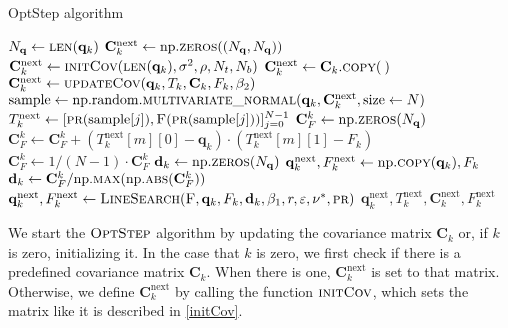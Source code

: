 \begin{algorithm}[H]%
\caption{\label{OptStep}OptStep algorithm}
\begin{algorithmic}[1]
\State $N_\mathbf{q}\gets\Call{len}{\mathbf{q}_k}$
\State $\mathbf{C}^\mathrm{next}_k \gets \mathrm{np.}\Call{zeros}{(N_\mathbf{q}, N_\mathbf{q})}$
\label{alg2differ1}
\State $\mathbf{C}^\mathrm{next}_k \gets \Call{initCov}{\protect\Call{len}{\mathbf{q}_k}, \sigma^2, \rho, N_t, N_b}$
\Else
\State $\mathbf{C}^\mathrm{next}_k \gets \mathbf{C}_k.\Call{copy}{\:}$
\EndIf\label{alg2differ2}
\Else
\State $\mathbf{C}^\mathrm{next}_k \gets \Call{updateCov}{\mathbf{q}_k, T_k, \mathbf{C}_k, F_k ,\beta_2}$
\EndIf
\State $\mathrm{sample} \gets \mathrm{np.random.}\Call{multivariate\_normal}{\mathbf{q}_k, \mathbf{C}^\mathrm{next}_k, \mathrm{size} \gets N}$
\State \label{OptStepFOMCall1}$T^\mathrm{next}_k\gets[\Call{pr}{\mathrm{sample}[j]},\Call{F}{\protect\Call{pr}{\mathrm{sample}[j]}}]_{j=0}^{N-1}$
\State $\mathbf{C}^k_F \gets \mathrm{np.}\Call{zeros}{N_\mathbf{q}}$
\State $\mathbf{C}^k_F \gets \mathbf{C}^k_F+(T^\mathrm{next}_k[m][0]-\mathbf{q}_k)\cdot(T^\mathrm{next}_k[m][1]-F_k)$
\EndFor
\State $\mathbf{C}^k_F \gets 1/(N-1)\cdot\mathbf{C}^k_F$
\State $\mathbf{d}_k \gets \mathrm{np.}\Call{zeros}{N_\mathbf{q}}$
\State $\mathbf{q}^\mathrm{next}_{k}, F^\mathrm{next}_k \gets \mathrm{np.}\Call{copy}{\mathbf{q}_k},F_k$
\label{alg2differ3}
\State $\mathbf{d}_k \gets \mathbf{C}^k_F/\mathrm{np.}\Call{max}{\mathrm{np.}\protect\Call{abs}{\mathbf{C}^k_F}}$
\State \label{OptStepFOMCall2}$\mathbf{q}^\mathrm{next}_{k}, F^\mathrm{next}_k \gets \Call{LineSearch}{\textproc{F},\mathbf{q}_k,F_k,\mathbf{d}_k,\beta_1,r,\varepsilon,\nu^*,\textproc{pr}}$
\EndIf
\State \Return $\mathbf{q}^\mathrm{next}_k,T^\mathrm{next}_k,\mathbf{C}^\mathrm{next}_k,F^\mathrm{next}_k$
\EndFunction
\end{algorithmic}
\end{algorithm}

We start the $\textproc{OptStep}$ algorithm by updating the covariance matrix $\mathbf{C}_k$ or, if $k$ is zero, initializing it. In the case that $k$ is zero, we first check if there is a predefined covariance matrix $\mathbf{C}_k$. When there is one, $\mathbf{C}^\mathrm{next}_k$ is set to that matrix. Otherwise, we define $\mathbf{C}^\mathrm{next}_k$ by calling the function $\textproc{initCov}$, which sets the matrix like it is described in \eqref{initCov}.

